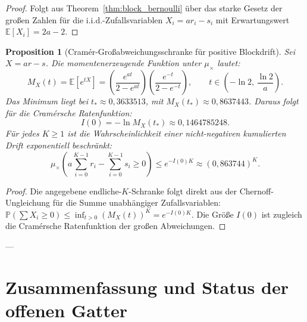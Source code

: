 \documentclass[11pt,reqno]{amsart}
\newtheorem{proposition}[theorem]{Proposition}
\theoremstyle{definition}
\theoremstyle{remark}
\numberwithin{equation}{section}
\begin{document}
\begin{proof}
Folgt aus Theorem~\ref{thm:block_bernoulli} \"uber das starke Gesetz der gro\ss{}en Zahlen f\"ur die i.i.d.-Zufallsvariablen $X_i = a r_i - s_i$ mit Erwartungswert $\mathbb{E}[X_i] = 2a - 2$.
\end{proof}

\begin{proposition}[Cram\'er-Gro\ss{}abweichungsschranke f\"ur positive Blockdrift]
\label{prop:cramer_tail}
Sei $X = a r - s$. Die momentenerzeugende Funktion unter $\mu_\times$ lautet:
\begin{equation}
M_X(t) = \mathbb{E}[e^{t X}] = \left( \frac{e^{a t}}{2 - e^{a t}} \right) \left( \frac{e^{-t}}{2 - e^{-t}} \right), \qquad t \in \left(-\ln 2, \, \frac{\ln 2}{a}\right).
\end{equation}
Das Minimum liegt bei $t_* \approx 0{,}3633513$, mit $M_X(t_*) \approx 0{,}8637443$. 
Daraus folgt f\"ur die Cram\'ersche Ratenfunktion:
\begin{equation}
I(0) = - \ln M_X(t_*) \approx 0{,}1464785248.
\end{equation}
F\"ur jedes $K \ge 1$ ist die Wahrscheinlichkeit einer nicht-negativen kumulierten Drift exponentiell beschr\"ankt:
\begin{equation}
\mu_\times\left( a \sum_{i=0}^{K-1} r_i - \sum_{i=0}^{K-1} s_i \ge 0 \right) \le e^{-I(0) K} \approx (0{,}863744)^K.
\end{equation}
\end{proposition}

\begin{proof}
Die angegebene endliche-$K$-Schranke folgt direkt aus der Chernoff-Ungleichung f\"ur die Summe unabh\"angiger Zufallsvariablen: $\mathbb{P}(\sum X_i \ge 0) \le \inf_{t > 0} (M_X(t))^K = e^{-I(0) K}$. Die Gr\"o\ss{}e $I(0)$ ist zugleich die Cram\'ersche Ratenfunktion der gro\ss{}en Abweichungen.
\end{proof}

---

\section{Zusammenfassung und Status der offenen Gatter}
\end{document}
